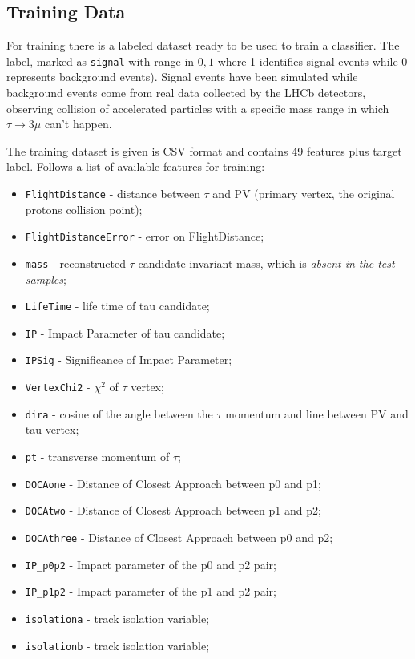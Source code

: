 \documentclass[11pt]{article}
\begin{document}
\subsection{Training Data}
For training there is a labeled dataset ready to be used to train a classifier.
The label, marked as \texttt{signal} with range in ${0,1}$ where 1 identifies
signal events while 0 represents background events). Signal events have been
simulated while background events come from real data collected by the LHCb
detectors, observing collision of accelerated particles with a specific mass
range in which $\tau \rightarrow 3\mu$ can't happen.

The training dataset is given is CSV format and contains 49 features plus target
label. Follows a list of available features for training:
\begin{itemize}
	\item \texttt{FlightDistance} - distance between $\tau$ and PV (primary vertex, the
		original protons collision point);
	\item \texttt{FlightDistanceError} - error on FlightDistance;
	\item \texttt{mass} - reconstructed $\tau$ candidate invariant mass, which
		is \textit{absent in the test samples};
	\item \texttt{LifeTime} - life time of tau candidate;
	\item \texttt{IP} - Impact Parameter of tau candidate;
	\item \texttt{IPSig} - Significance of Impact Parameter;
	\item \texttt{VertexChi2} - $\chi^2$ of $\tau$ vertex;
	\item \texttt{dira} - cosine of the angle between the $\tau$ momentum and line
		between PV and tau vertex;
	\item \texttt{pt} - transverse momentum of $\tau$;
	\item \texttt{DOCAone} - Distance of Closest Approach between p0 and p1;
	\item \texttt{DOCAtwo} - Distance of Closest Approach between p1 and p2;
	\item \texttt{DOCAthree} - Distance of Closest Approach between p0 and p2;
	\item \texttt{IP\_p0p2} - Impact parameter of the p0 and p2 pair;
	\item \texttt{IP\_p1p2} - Impact parameter of the p1 and p2 pair;
	\item \texttt{isolationa} - track isolation variable;
	\item \texttt{isolationb} - track isolation variable;

\end{itemize}
\end{document}
